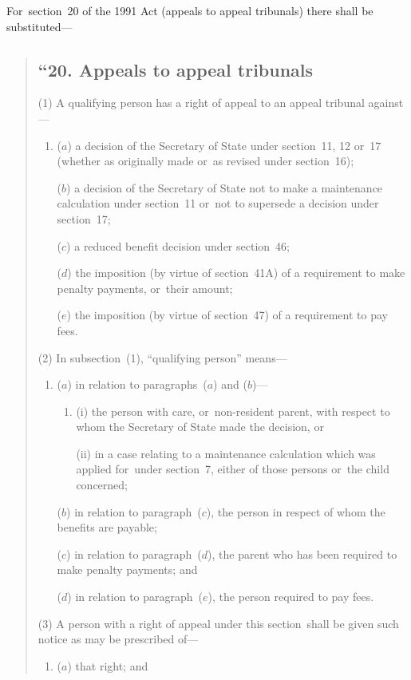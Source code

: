 \documentclass[12pt,a4paper]{article}
\begin{document}
For~section~20 of the 1991 Act (appeals to appeal tribunals) there shall be substituted—
\begin{quotation}
\subsection*{“20. Appeals to appeal tribunals}

(1) A qualifying person has a right of appeal to an appeal tribunal against—
\begin{enumerate}\item[]
($a$) a decision of the Secretary of State under section~11, 12 or~17 (whether as originally made or~as revised under section~16);

($b$) a decision of the Secretary of State not to make a maintenance calculation under section~11 or~not to supersede a decision under section~17;

($c$) a reduced benefit decision under section~46;

($d$) the imposition (by virtue of section~41A) of a requirement to make penalty payments, or~their amount;

($e$) the imposition (by virtue of section~47) of a requirement to pay fees.
\end{enumerate}

(2) In subsection~(1), “qualifying person” means—
\begin{enumerate}\item[]
($a$) in relation to paragraphs~($a$)  and ($b$)—
\begin{enumerate}\item[]
(i) the person with care, or~non-resident parent, with respect to whom the Secretary of State made the decision, or

(ii) in a case relating to a maintenance calculation which was applied for~under section~7, either of those persons or~the child concerned;
\end{enumerate}

($b$) in relation to paragraph~($c$), the person in respect of whom the benefits are payable;

($c$) in relation to paragraph~($d$), the parent who has been required to make penalty payments; and

($d$) in relation to paragraph~($e$), the person required to pay fees.
\end{enumerate}

(3) A person with a right of appeal under this section~shall be given such notice as may be prescribed of—
\begin{enumerate}\item[]
($a$) that right; and


\end{enumerate}
\end{quotation}
\end{document}
